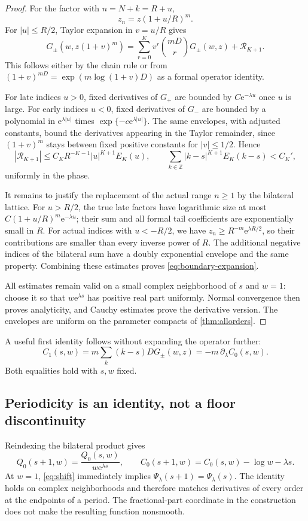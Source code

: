 \documentclass[11pt,a4paper]{article}
\numberwithin{equation}{section}
\theoremstyle{definition}
\newcommand{\Z}{\mathbb Z}
\newcommand{\ee}{\mathrm e}
\begin{document}
\begin{proof}
For the factor with $n=N+k=R+u$,
\[
 z_n=z(1+u/R)^m.
\]
For $|u|\leq R/2$, Taylor expansion in $v=u/R$ gives
\begin{equation}
 G_\pm(w,z(1+v)^m)
 =\sum_{r=0}^K v^r\binom{mD}{r}G_\pm(w,z)
   +\mathcal R_{K+1}.
 \label{eq:operator-taylor}
\end{equation}
This follows either by the chain rule or from
$(1+v)^{mD}=\exp(m\log(1+v)D)$ as a formal operator identity.

For late indices $u>0$, fixed derivatives of $G_+$ are bounded by $C\ee^{-\lambda u}$ once $u$ is large. For early indices $u<0$, fixed derivatives of $G_-$ are bounded by a polynomial in $\ee^{\lambda|u|}$ times $\exp\{-c\ee^{\lambda|u|}\}$. The same envelopes, with adjusted constants, bound the derivatives appearing in the Taylor remainder, since $(1+v)^m$ stays between fixed positive constants for $|v|\leq1/2$. Hence
\[
 |\mathcal R_{K+1}|\leq C_K R^{-K-1}|u|^{K+1}E_K(u),
 \qquad \sum_{k\in\Z}|k-s|^{K+1}E_K(k-s)<C_K',
\]
uniformly in the phase.

It remains to justify the replacement of the actual range $n\geq1$ by the bilateral lattice. For $u>R/2$, the true late factors have logarithmic size at most
$C(1+u/R)^m\ee^{-\lambda u}$; their sum and all formal tail coefficients are exponentially small in $R$. For actual indices with $u<-R/2$, we have
$z_n\geq R^{-m}\ee^{\lambda R/2}$, so their contributions are smaller than every inverse power of $R$. The additional negative indices of the bilateral sum have a doubly exponential envelope and the same property. Combining these estimates proves \eqref{eq:boundary-expansion}.

All estimates remain valid on a small complex neighborhood of $s$ and $w=1$: choose it so that $w\ee^{\lambda s}$ has positive real part uniformly. Normal convergence then proves analyticity, and Cauchy estimates prove the derivative version. The envelopes are uniform on the parameter compacts of \cref{thm:allorders}.
\end{proof}

A useful first identity follows without expanding the operator further:
\begin{equation}
 C_1(s,w)=m\sum_k(k-s)DG_\pm(w,z)
 =-m\,\partial_\lambda C_0(s,w).
 \label{eq:C1}
\end{equation}
Both equalities hold with $s,w$ fixed.

\subsection{Periodicity is an identity, not a floor discontinuity}
Reindexing the bilateral product gives
\begin{equation}
 Q_0(s+1,w)=\frac{Q_0(s,w)}{w\ee^{\lambda s}},
 \qquad C_0(s+1,w)=C_0(s,w)-\log w-\lambda s.
 \label{eq:shift}
\end{equation}
At $w=1$, \eqref{eq:shift} immediately implies
$\Psi_\lambda(s+1)=\Psi_\lambda(s)$. The identity holds on complex neighborhoods and therefore matches derivatives of every order at the endpoints of a period. The fractional-part coordinate in the construction does not make the resulting function nonsmooth.
\end{document}
